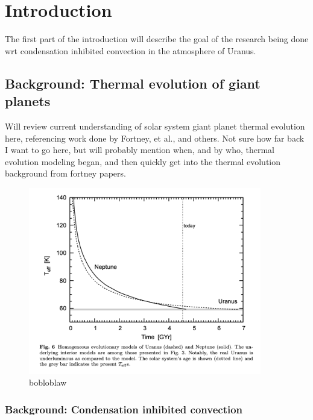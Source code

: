 \documentclass[11pt]{ucscthesisbs}
\begin{document}
\chapter{Introduction}
The first part of the introduction will describe the goal of the research being done wrt condensation inhibited convection in the atmosphere of Uranus. 



\section{Background: Thermal evolution of giant planets}

Will review current understanding of solar system giant planet thermal evolution here, referencing work done by Fortney, et al., and others. Not sure how far back I want to go here, but will probably mention when, and by who, thermal evolution modeling began, and then quickly get into the thermal evolution background from fortney papers.

\begin{figure}[t!]
 \centerline{
  \includegraphics[width=4.0in]{fortney_nettelmann2010_UN_curves.png}
 }
\caption[Transverse Scans at difference Temperatures at $H=11$~T]
{bobloblaw 
}
\label{fig:discretescan}
\end{figure}


\subsection{Background: Condensation inhibited convection}\label{subsection_example}

\end{document}
